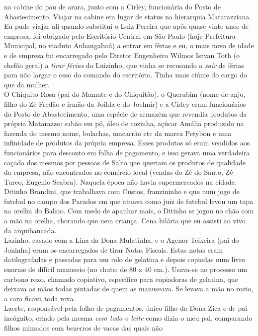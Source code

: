 \documentclass[12pt,brazil,]{book}
\begin{document}
na cabine do pau de arara, junto com a Cirley, funcionária do Posto de
Abastecimento. Viajar na cabine era lugar de status na hierarquia
Matarazziana. Eu pude viajar ali quando substituí o Luiz Pereira que
após quase vinte anos de empresa, foi obrigado pelo Escritório Central
em São Paulo (hoje Prefeitura Municipal, no viaduto Anhangabaú) a entrar
em férias e eu, o mais novo de idade e de empresa fui encarregado pelo
Diretor Engenheiro Wilmos Istvan Toth (o chefão geral) a \emph{tirar
férias} do Luizinho, que vinha se recusando a \emph{sair} de férias para
não largar o osso do comando do escritório. Tinha mais ciúme do cargo do
que da mulher.\\
O Chiquito Rosa (pai do Mamute e do Chiquitão), o Querubim (nome de
anjo, filho do Zé Fredão e irmão da Joilda e do Joelmir) e a Cirley eram
funcionários do Posto de Abastecimento, uma espécie de armazém que
revendia produtos da própria Matarazzo: sabão em pó, óleo de cozinha,
açúcar Amália produzido na fazenda do mesmo nome, bolachas, macarrão etc
da marca Petybon e uma infinidade de produtos da própria empresa. Esses
produtos só eram vendidos aos funcionários para desconto em folha de
pagamento, e isso gerava uma verdadeira caçada dos mesmos por pessoas de
Salto que queriam os produtos de qualidade da empresa, não encontrados
no comércio local (vendas do Zé do Santo, Zé Turco, Eugenio Seabra).
Naquela época não havia supermercados na cidade.\\
Ditinho Brandini, que trabalhava com Custos, franzininho e que num jogo
de futebol no campo dos Parados em que atuava como juiz de futebol levou
um tapa na orelha do Balaio. Com medo de apanhar mais, o Ditinho se
jogou no chão com a mão na orelha, chorando que nem criança. Cena
hilária que eu assisti ao vivo da arquibancada.\\
Lazinho, casado com a Lina da Dona Mulatinha, e o Agenor Teixeira (pai
do Joninha) eram os encarregados de tirar Notas Fiscais. Estas notas
eram datilografadas e passadas para um rolo de gelatina e depois
copiadas num livro enorme de difícil manuseio (no chute: de 80 x 40
cm.). Usava-se no processo um carbono roxo, chamado copiativo,
específico para copiadoras de gelatina, que deixava as mãos todas
pintadas de quem as manuseava. Se levava a mão no rosto, a cara ficava
toda roxa.\\
Laerte, responsável pela folha de pagamentos, único filho da Dona Zica e
de pai incógnito, criado pela mesma \emph{com todo o leite} como dizia o
meu pai, comparando filhos mimados com bezerros de vacas das quais não
\end{document}
